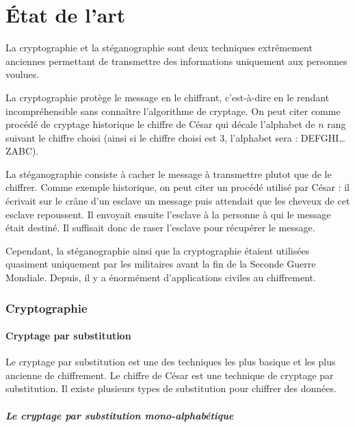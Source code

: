 \documentclass[a4paper,12pt]{article}
\begin{document}
\newpage

\part{\'{E}tat de l'art}
La cryptographie et la stéganographie sont deux techniques extrêmement anciennes permettant de transmettre des informations uniquement aux personnes voulues.

La cryptographie protège le message en le chiffrant, c'est-à-dire en le rendant incompréhensible sans connaître l'algorithme de cryptage. On peut citer comme procédé de cryptage historique le chiffre de César qui décale l'alphabet de $n$ rang suivant le chiffre choisi (ainsi si le chiffre choisi est 3, l'alphabet sera : DEFGHI\dots{}ZABC).

La stéganographie consiste à cacher le message à transmettre plutot que de le chiffrer. Comme exemple historique, on peut citer un procédé utilisé par César : il écrivait sur le crâne d'un esclave un message puis attendait que les cheveux de cet esclave repoussent. Il envoyait ensuite l'esclave à la personne à qui le message était destiné. Il suffisait donc de raser l'esclave pour récupérer le message.

Cependant, la stéganographie ainsi que la cryptographie étaient utilisées quasiment uniquement par les militaires avant la fin de la Seconde Guerre Mondiale. Depuis, il y a énormément d'applications civiles au chiffrement.

\section{Cryptographie}

\subsection{Cryptage par substitution}

Le cryptage par substitution est une des techniques les plus basique et les plus ancienne de chiffrement. Le chiffre de César est une technique de cryptage par substitution. Il existe plusieurs types de substitution pour chiffrer des données.

\subsubsection{Le cryptage par substitution mono-alphabétique}
\end{document}
